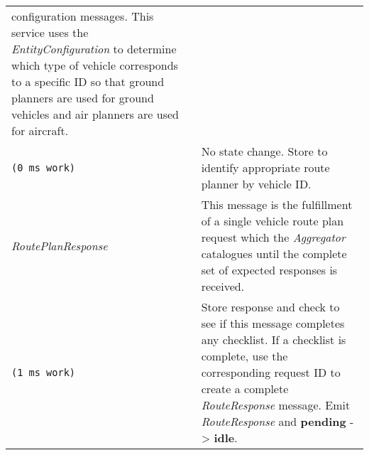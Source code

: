 \begin{longtable}[c]{@{}ll@{}}
\begin{minipage}[t]{0.65\columnwidth}
configuration messages. This service uses the \emph{EntityConfiguration}
to determine which type of vehicle corresponds to a specific ID so that
ground planners are used for ground vehicles and air planners are used
for aircraft.
\strut\end{minipage}\tabularnewline
\begin{minipage}[t]{0.29\columnwidth}\raggedright\strut
\begin{verbatim}
(0 ms work)
\end{verbatim}
\strut\end{minipage} &
\begin{minipage}[t]{0.65\columnwidth}\raggedright\strut
No state change. Store to identify appropriate route planner by vehicle
ID.
\strut\end{minipage}\tabularnewline
\begin{minipage}[t]{0.29\columnwidth}\raggedright\strut
\emph{RoutePlanResponse}
\strut\end{minipage} &
\begin{minipage}[t]{0.65\columnwidth}\raggedright\strut
This message is the fulfillment of a single vehicle route plan request
which the \emph{Aggregator} catalogues until the complete set of
expected responses is received.
\strut\end{minipage}\tabularnewline
\begin{minipage}[t]{0.29\columnwidth}\raggedright\strut
\begin{verbatim}
(1 ms work)
\end{verbatim}
\strut\end{minipage} &
\begin{minipage}[t]{0.65\columnwidth}\raggedright\strut
Store response and check to see if this message completes any checklist.
If a checklist is complete, use the corresponding request ID to create a
complete \emph{RouteResponse} message. Emit \emph{RouteResponse} and
\textbf{pending} -\textgreater{} \textbf{idle}.
\strut\end{minipage}\tabularnewline
\bottomrule
\end{longtable}

